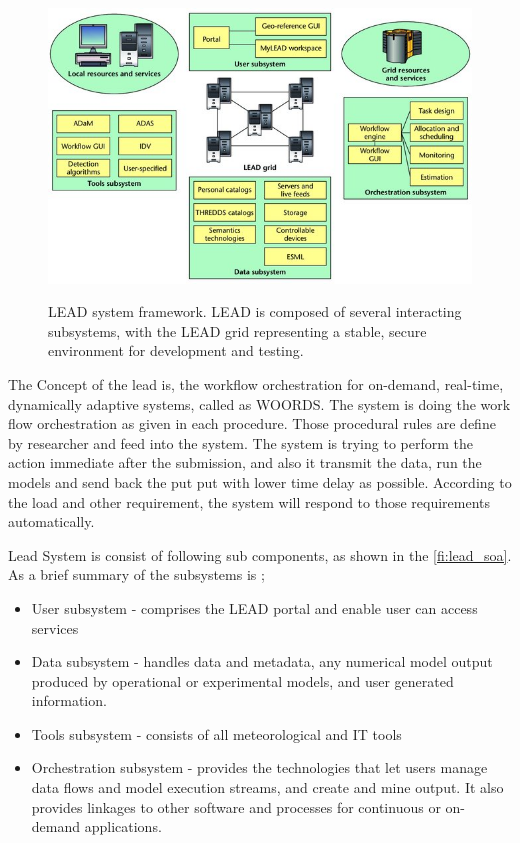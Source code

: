 \begin{figure}[htp]
    \centering
    \includegraphics[width=1.0\textwidth]{lead/LEAD-system-framework-LEAD-is-composed-of-several-interacting-subsystems-with-the-LEAD_W640.jpg}\\
    \caption{ LEAD system framework. LEAD is composed of several interacting subsystems, with the LEAD grid representing a stable, secure environment for development and testing. \cite{Droegemeier2005Service-OrientedWeather} }
    \label{fi:lead_framework}
\end{figure}

The Concept of the \acrshort{lead} is, the workflow orchestration for on-demand, real-time, dynamically adaptive systems, called as WOORDS. The system is doing the work flow orchestration as given in each procedure. Those procedural rules are define by researcher and feed into the system. The system is trying to perform the action immediate after the submission, and also it transmit the data, run the models and send back the put put with lower time delay as possible. According to the load and other requirement, the system will respond to those requirements automatically.

Lead System is consist of following sub components, as shown in the \ref{fi:lead_soa}. As a brief summary of the subsystems is \cite{Droegemeier2005Service-OrientedWeather};
\begin{itemize}
\item User subsystem - comprises the LEAD portal and enable user can access services
\item Data subsystem - handles data and metadata, any numerical model output produced by operational or experimental models, and user generated information.
\item Tools subsystem - consists of all meteorological and IT tools
\item Orchestration subsystem - provides the technologies that let users manage data flows and model execution streams, and create and mine output. It also provides linkages to other software and processes for continuous or on-demand applications. 
\end{itemize}

